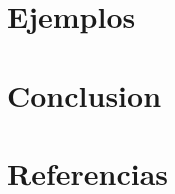 \documentclass{pre-tfg}
\begin{document}
\section{Ejemplos}

\section{Conclusion}



\section{Referencias}

\clearpage


\nocite{*}
\printbibliography
\end{document}
